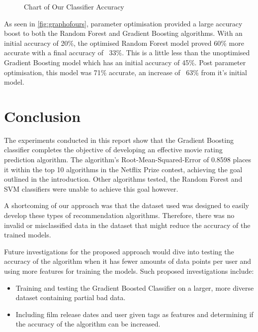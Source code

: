 \documentclass{report}
\begin{document}
	\begin{figure}[H]
		\centering
		\caption{Chart of Our Classifier Accuracy}
		\label{fig:graphofours}
	\end{figure}
	
	As seen in \autoref{fig:graphofours}, parameter optimisation provided a large accuracy boost to both the Random Forest and Gradient Boosting algorithms. With an initial accuracy of 20\%, the optimised Random Forest model proved 60\% more accurate with a final accuracy of ~33\%. This is a little less than the unoptimised Gradient Boosting model which has an initial accuracy of 45\%. Post parameter optimisation, this model was 71\% accurate, an increase of ~63\% from it’s initial model.
	
	\chapter{Conclusion}
	The experiments conducted in this report show that the Gradient Boosting classifier completes the objective of developing an effective movie rating prediction algorithm. The algorithm’s Root-Mean-Squared-Error of 0.8598 places it within the top 10 algorithms in the Netflix Prize contest, achieving the goal outlined in the introduction. Other algorithms tested, the Random Forest and SVM classifiers were unable to achieve this goal however.
	
	A shortcoming of our approach was that the dataset used was designed to easily develop these types of recommendation algorithms. Therefore, there was no invalid or misclassified data in the dataset that might reduce the accuracy of the trained models.
	
	Future investigations for the proposed approach would dive into testing the accuracy of the algorithm when it has fewer amounts of data points per user and using more features for training the models. Such proposed investigations include: 
	\begin{itemize}
		\item Training and testing the Gradient Boosted Classifier on a larger, more diverse dataset containing partial bad data.
		\item Including film release dates and user given tags as features and determining if the accuracy of the algorithm can be increased.
	\end{itemize}
	
	\newpage
	\printbibliography
	
\end{document}
